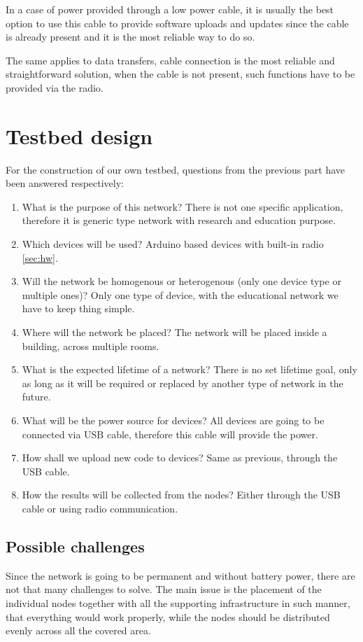 \documentclass[
  print, %
  table,   %
  nolof,     %
  nolot,     %
           oneside
]{fithesis3}
\begin{document}
  In a case of power provided through a low power cable, it is usually the best option to use this cable to provide software uploads and updates since the cable is already present and it is the most reliable way to do so.

  The same applies to data transfers, cable connection is the most reliable and straightforward solution, when the cable is not present, such functions have to be provided via the radio.

  \section{Testbed design}
  For the construction of our own testbed, questions from the previous part have been answered respectively:
  \begin{enumerate}

    \item What is the purpose of this network? There is not one specific application, therefore it is generic type network with research and education purpose.
    \item Which devices will be used? Arduino based devices with built-in radio \ref{sec:hw}.
    \item Will the network be homogenous or heterogenous (only one device type or multiple ones)? Only one type of device, with the educational network we have to keep thing simple.
    \item Where will the network be placed? The network will be placed inside a building, across multiple rooms.
    \item What is the expected lifetime of a network? There is no set lifetime goal, only as long as it will be required or replaced by another type of network in the future.
    \item What will be the power source for devices? All devices are going to be connected via USB cable, therefore this cable will provide the power.
    \item How shall we upload new code to devices? Same as previous, through the USB cable.
    \item How the results will be collected from the nodes? Either through the USB cable or using radio communication.

  \end{enumerate}
  \subsection{Possible challenges}
  Since the network is going to be permanent and without battery power, there are not that many challenges to solve. The main issue is the placement of the individual nodes together with all the supporting infrastructure in such manner, that everything would work properly, while the nodes should be distributed evenly across all the covered area.
\end{document}
